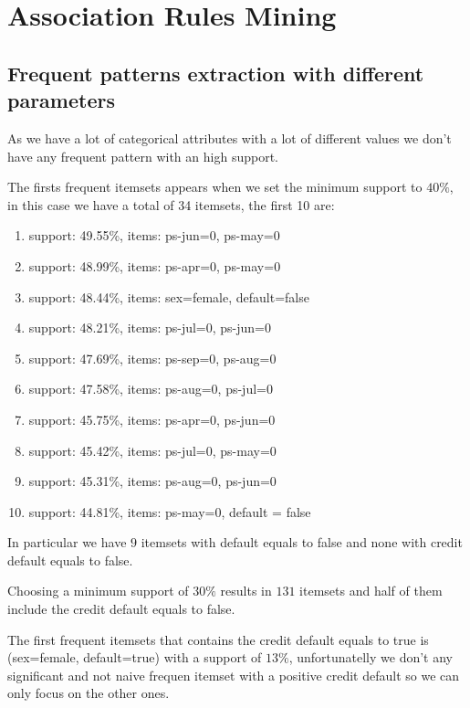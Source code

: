 \chapter{Association Rules Mining}

\section{Frequent patterns extraction with different parameters}

As we have a lot of categorical attributes with a lot of different values we don't have any frequent pattern with an high support. 

The firsts frequent itemsets appears when we set the minimum support to $40\%$, in this case we have a total of 34 itemsets, the first 10 are:

\begin{enumerate}
  \item support: 49.55\%, items: ps-jun=0, ps-may=0
  \item support: 48.99\%, items: ps-apr=0, ps-may=0
  \item support: 48.44\%, items: sex=female, default=false
  \item support: 48.21\%, items: ps-jul=0, ps-jun=0
  \item support: 47.69\%, items: ps-sep=0, ps-aug=0
  \item support: 47.58\%, items: ps-aug=0, ps-jul=0
  \item support: 45.75\%, items: ps-apr=0, ps-jun=0
  \item support: 45.42\%, items: ps-jul=0, ps-may=0
  \item support: 45.31\%, items: ps-aug=0, ps-jun=0
  \item support: 44.81\%, items: ps-may=0, default = false
\end{enumerate}

In particular we have $9$ itemsets with default equals to false and none with credit default equals to false.

\smallskip

Choosing a minimum support of $30\%$ results in $131$ itemsets and half of them include the credit default equals to false.

\smallskip

The first frequent itemsets that contains the credit default equals to true is (sex=female, default=true) with a support of $13\%$, unfortunatelly we don't any significant and not naive frequen itemset with a positive credit default so we can only focus on the other ones.

